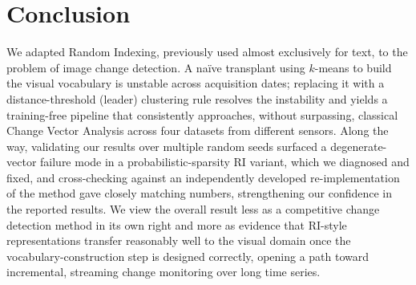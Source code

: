 \documentclass[11pt]{article}
\begin{document}
\section{Conclusion}

We adapted Random Indexing, previously used almost exclusively for text, to the problem of image change detection. A na\"ive transplant using $k$-means to build the visual vocabulary is unstable across acquisition dates; replacing it with a distance-threshold (leader) clustering rule resolves the instability and yields a training-free pipeline that consistently approaches, without surpassing, classical Change Vector Analysis across four datasets from different sensors. Along the way, validating our results over multiple random seeds surfaced a degenerate-vector failure mode in a probabilistic-sparsity RI variant, which we diagnosed and fixed, and cross-checking against an independently developed re-implementation of the method gave closely matching numbers, strengthening our confidence in the reported results. We view the overall result less as a competitive change detection method in its own right and more as evidence that RI-style representations transfer reasonably well to the visual domain once the vocabulary-construction step is designed correctly, opening a path toward incremental, streaming change monitoring over long time series.



\end{document}
